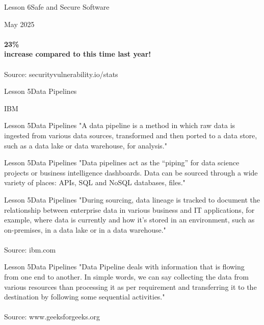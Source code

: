 \documentclass[aspectratio=1610]{beamer}
\begin{document}
\begin{frame}{Lesson 6}{Safe and Secure Software}
\Huge
\begin{center}
May 2025\\~\\
\textbf{23\%\\
 increase compared to this time last year!}\\~\\ 
\large
Source: securityvulnerability.io/stats
\end{center}


\end{frame}





\begin{frame}{Lesson 5}{Data Pipelines}
\Huge
\begin{center}
 IBM
\end{center}
\end{frame}

\begin{frame}{Lesson 5}{Data Pipelines}
\LARGE
"A data pipeline is a method in which raw data is ingested from 
various data sources, transformed and then ported to a data store, 
such as a data lake or data warehouse, for analysis."
\end{frame}

\begin{frame}{Lesson 5}{Data Pipelines}
\LARGE
"Data pipelines act as the “piping” for data science projects or 
business intelligence dashboards. Data can be sourced through a wide 
variety of places: APIs, SQL and NoSQL databases, files."
\end{frame}

\begin{frame}{Lesson 5}{Data Pipelines}
\LARGE
"During sourcing, data lineage is tracked to document the 
relationship between enterprise data in various business and IT 
applications, for example, where data is currently and how it’s 
stored in an environment, such as on-premises, in a data lake or in a
data warehouse."\\~\\
Source: ibm.com
\end{frame}




\begin{frame}{Lesson 5}{Data Pipelines}
\LARGE
"Data Pipeline deals with information that is flowing from one end to 
another. In simple words, we can say collecting the data from various 
resources than processing it as per requirement and transferring it 
to the destination by following some sequential activities."\\~\\
Source: www.geeksforgeeks.org
\end{frame}
\end{document}
